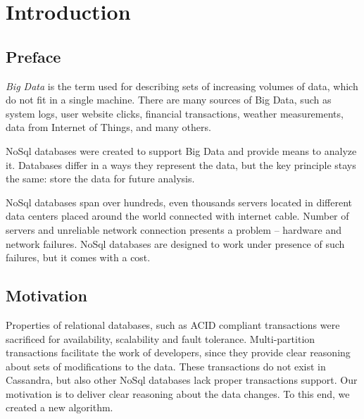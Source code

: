 
\chapter{Introduction}\label{chapter:introduction}

\section{Preface}\label{sec:introduction:preface}
\emph{Big Data} is the term used for describing sets of increasing volumes of data, which do not fit in a single machine. There are many sources of Big Data, such as system logs, user website clicks, financial transactions, weather measurements, data from Internet of Things, and many others. 

NoSql databases were created to support Big Data and provide means to analyze it. Databases differ in a ways they represent the data, but the key principle stays the same: store the data for future analysis.

NoSql databases span over hundreds, even thousands servers located in different data centers placed around the world connected with internet cable. Number of servers and unreliable network connection presents a problem -- hardware and network failures.
NoSql databases are designed to work under presence of such failures, but it comes with a cost.

\section{Motivation}\label{sec:introduction:motivation}


Properties of relational databases, such as ACID compliant transactions were sacrificed for availability, scalability and fault tolerance. Multi-partition transactions facilitate the work of developers, since they provide clear reasoning about sets of modifications to the data. These transactions do not exist in Cassandra, but also other NoSql databases lack proper transactions support.
Our motivation is to deliver clear reasoning about the data changes. To this end, we created a new algorithm.



